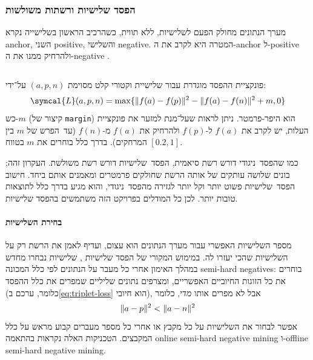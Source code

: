 \documentclass[hebrew, a4paper]{article}
\theoremstyle{plain}
\theoremstyle{definition}
\numberwithin{equation}{section}
\DeclarePairedDelimiter\norm{\lVert}{\rVert}
\DeclarePairedDelimiter\set{\{}{\}}
\begin{document}
\subsubsection{הפסד שלישיות ורשתות משולשות}
\label{sec:triplet-loss}

מערך הנתונים מחולק הפעם לשלישיות, ללא תווית, כשהרכיב הראשון בשלישייה
נקרא anchor, השני positive, והשלישי negative. המטרה היא לקרב את
ה-anchor ל-positive ולהרחיק ממנו את ה-negative .

\begin{listing}
  \inputminted{python}{snippets/TripletLoss.py}
  \caption[הפסד שלישיות (triplet loss)]{הפסד שלישיות (\autoref{eq:triplet-loss}). חלק מהפונקציות הושמטו.}
  \label{lst:triplet-loss}
\end{listing}

פונקציית ההפסד מוגדרת עבור שלישיית וקטורי קלט מסוימת $(a,p,n)$
על־ידי:
\begin{equation}
  \label{eq:triplet-loss}
  \symcal{L}(a,p,n) = \max\set{\norm{f(a)-f(p)}^2 - \norm{f(a)-f(n)}^2 + m, 0}
\end{equation}
כש-$m$ (קיצור של \verb|margin|) הוא היפר-פרמטר. ניתן לראות שעל־מנת
למזער את פונקציית העלות, יש לקרב את $f(a)$ ל-$f(p)$ ולהרחיק את $f(a)$
מ-$f(n)$ (עד~הפרש של $m$ בין המרחקים). בדרך כלל בוחרים את $m$ בטווח
$[0.2,1]$.

כמו שהפסד~ניגודי דורש רשת סיאמית, הפסד~שלישיות דורש רשת משולשת. העקרון
זהה; בונים שלושה עותקים של אותה הרשת שחולקים פרמטרים ומאמנים אותם
ביחד. חישוב הפסד~שלישיות פשוט יותר וקל יותר לגזירה מהפסד~ניגודי, והוא
מגיע בדרך כלל לתוצאות טובות יותר. לכן כל המודלים בפרויקט הזה משתמשים
בהפסד שלישיות.

\paragraph{בחירת השלישיות}

מספר השלישיות האפשרי עבור מערך הנתונים הוא עצום, ועדיף לאמן את הרשת רק
על השלישיות שהכי יעזרו לה. במימוש המקורי של הפסד שלישיות
, שלישיות נבחרו מחדש במהלך האימון אחרי כל מעבר על
הנתונים לפי כלל המכונה semi-hard negatives: בוחרים את כל הזוגות
החיוביים האפשריים, ומצרפים נתונים שליליים שמפרים את כלל ההפסד (כלומר,
ערכם ב\autoref{eq:triplet-loss} הוא חיובי), אבל לא מפרים אותו
\emph{מדי}, כלומר
\begin{equation}
  \label{eq:triplet-semi-hard}
  \norm{a-p}^2 < \norm{a-n}^2
\end{equation}
אפשר לבחור את השלישיות על כל מקבץ או אחרי כל מספר מעברים קבוע מראש על
כלל המקבצים. הטכניקות האלה נקראות בהתאמה online semi-hard negative
mining ו-offline semi-hard negative mining.
\end{document}
